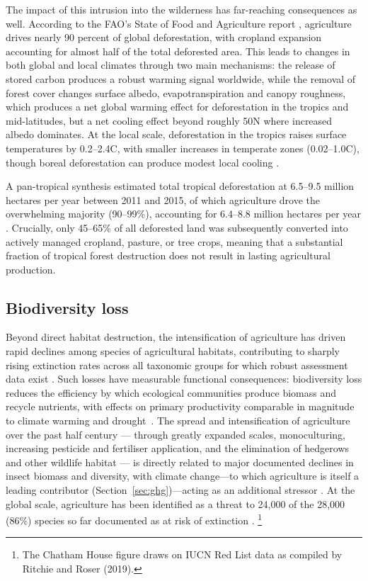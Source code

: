 The impact of this intrusion into the wilderness has far-reaching consequences as well. According to the FAO's State of Food and Agriculture report \cite[4]{FAO2025StateFoodAgri}, agriculture drives nearly 90 percent of global deforestation, with cropland expansion accounting for almost half of the total deforested area. This leads to changes in both global and local climates through two main mechanisms: the release of stored carbon produces a robust warming signal worldwide, while the removal of forest cover changes surface albedo, evapotranspiration and canopy roughness, which produces a net global warming effect for deforestation in the tropics and mid-latitudes, but a net cooling effect beyond roughly 50\degree N where increased albedo dominates. At the local scale, deforestation in the tropics raises surface temperatures by 0.2--2.4\degree C, with smaller increases in temperate zones (0.02--1.0\degree C), though boreal deforestation can produce modest local cooling \cite[pp.~1,~6]{Lawrence2022-fv}.

A pan-tropical synthesis estimated total tropical deforestation at 6.5--9.5 million hectares per year between 2011 and 2015, of which agriculture drove the overwhelming majority (90--99\%), accounting for 6.4--8.8 million hectares per year \cite[pp.~1,~3]{pendrill2022deforestation}. Crucially, only 45--65\% of all deforested land was subsequently converted into actively managed cropland, pasture, or tree crops, meaning that a substantial fraction of tropical forest destruction does not result in lasting agricultural production.

\subsection{Biodiversity loss}
Beyond direct habitat destruction, the intensification of agriculture has driven rapid declines among species of agricultural habitats, contributing to sharply rising extinction rates across all taxonomic groups for which robust assessment data exist \cite[Section~2.2.5.1]{IPBES2019GlobalAssessment}. Such losses have measurable functional consequences: biodiversity loss reduces the efficiency by which ecological communities produce biomass and recycle nutrients, with effects on primary productivity comparable in magnitude to climate warming and drought~\cite[pp.~60--61]{cardinale2012biodiversity}. The spread and intensification of agriculture over the past half century --- through greatly expanded scales, monoculturing, increasing pesticide and fertiliser application, and the elimination of hedgerows and other wildlife habitat --- is directly related to major documented declines in insect biomass and diversity, with climate change---to which agriculture is itself a leading contributor (Section~\ref{sec:ghg})---acting as an additional stressor \cite[pp.~1--3]{raven2021insect}. At the global scale, agriculture has been identified as a threat to 24,000 of the 28,000 (86\%) species so far documented as at risk of extinction \cite[p.~7]{chathamhouse2021biodiversity}.%
\footnote{The Chatham House figure draws on IUCN Red List data as compiled by Ritchie and Roser (2019).}

